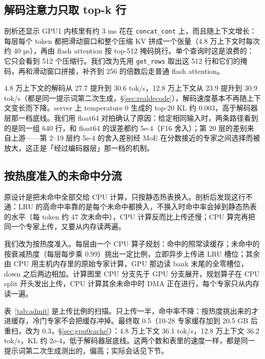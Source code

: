 \documentclass[11pt,a4paper]{article}
\newcommand{\code}[1]{\texttt{#1}}
\newcommand{\tps}{tok/s}
\begin{document}
\subsection{解码注意力只取 top-k 行}
\label{sec:gather}

剖析还显示 GPU1 内核里有约 3 ms 花在 \code{concat\_cont} 上，而且随上下文增长：每层每个 token 都把滑动窗口和整个压缩 KV 拼成一个张量（4.8 万上下文时每次约 40 µs），再由 flash attention 按 top-512 掩码挑行。单个查询时这是浪费的：它只会看到 512 个压缩行。我们改为先用 \code{get\_rows} 取出这 512 行和它们的掩码，再和滑动窗口拼接，补齐到 256 的倍数后走普通 flash attention。

4.8 万上下文的解码从 27.7 提升到 30.6 \tps{}，12.8 万上下文从 23.9 提升到 30.9 \tps{}（都是同一提示词第二次生成，\S\ref{sec:realdecode}），解码速度基本不再随上下文变长而下降。server 上 temperature 0 生成的 top-20 KL 约 0.003，高于解码器层那一档底线。我们用 float64 对拍确认了原因：给定相同输入时，两条路径看到的是同一组 640 行，和 float64 的误差都约 5e-4（F16 舍入）；第 20 层的差别来自上游——第 2--19 层约 5e-4 的舍入差别经 MoE 在分数接近的专家之间选择而被放大，这正是「经过编码器层」那一档的机制。

\subsection{按热度准入的未命中分流}

原设计是把未命中全部交给 CPU 计算，只按静态热表换入。剖析后发现这行不通：LRU 的高命中率靠的是每个未命中都换入，不换入时命中率会掉到静态热表的水平（每 token 约 47 次未命中），CPU 计算反而比上传还慢；CPU 算完再把同一个专家上传，又要从内存读两遍。

我们改为按热度准入。每层由一个 CPU 算子规划：命中的照常读缓存；未命中的按衰减热度（每层每步乘 0.99）挑出一定比例，立即异步上传进 LRU 槽位；其余由 CPU 用主机内存里的原始专家计算，GPU 那边读 bank 末尾的全零槽位，down 之后两边相加。计算图里 CPU 分支先于 GPU 分支展开，规划算子在 CPU split 开头发出上传，CPU 计算其余未命中时 DMA 正在进行，每个专家只从内存读一遍。

表~\ref{tab:admit} 是上传比例的扫描。只上传一半，命中率不降：按热度挑出来的才进缓存，冷门专家不会把缓存冲掉。最终取 0.5（10-28 专家缓存加到 20.5 GB 后重扫，改为 0.3，\S\ref{sec:gpu0cache}）：4.8 万上下文 36.1 \tps{}，12.8 万上下文 36.2 \tps{}，KL 约 2e-4，低于解码器层底线。这两个数和表里的速度一样，都是同一提示词第二次生成测出的，偏高；实际会话见下节。
\end{document}
